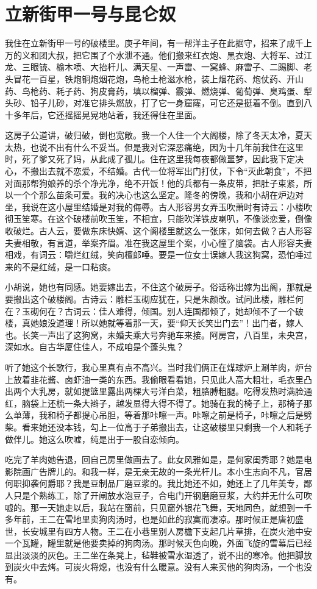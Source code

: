 \chapter{立新街甲一号与昆仑奴}

我住在立新街甲一号的破楼里。庚子年间，有一帮洋主子在此据守，招来了成千上万的义和团大叔，把它围了个水泄不通。他们搬来红衣炮、黑衣炮、大将军、过江龙、三眼铳、榆木喷、大抬杆儿、满天星、一声雷、一窝蜂、麻雷子、二踢脚、老头冒花一百星，铁炮铜炮烟花炮，鸟枪土枪滋水枪，装上烟花药、炮仗药、开山药、鸟枪药、耗子药、狗皮膏药，填以榴弹、霰弹、燃烧弹、葡萄弹、臭鸡蛋、犁头砂、铅子儿砂，对准它排头燃放，打了它一身窟窿，可它还是挺着不倒。直到八十多年后，它还摇摇晃晃地站着，我还得住在里面。 

这房子公道讲，破归破，倒也宽敞。我一个人住一个大阁楼，除了冬天太冷，夏天太热，也说不出有什么不妥当。但是我对它深恶痛绝，因为十几年前我住在这里时，死了爹又死了妈，从此成了孤儿。住在这里我每夜都做噩梦，因此我下定决心，不搬出去就不恋爱，不结婚。古代一位将军出门打仗，下令“灭此朝食”，不把对面那帮狗娘养的杀个净光净，绝不开饭！他的兵都有一条皮带，把肚子束紧，所以一个个那么苗条可爱。我的决心也这么坚定。隆冬的傍晚，我和小胡在炉边对坐，我说在这小屋里结婚是对我的侮辱。古人形容男女弄玉吹萧时有诗云：小楼吹彻玉笙寒。在这个破楼前吹玉笙，不相宜，只能吹洋铁皮喇叭，不像谈恋爱，倒像收破烂。古人云，要做东床快婿、这个阁楼里就这么一张床，如何去做？古人形容夫妻相敬，有言道，举案齐眉。准在我这屋里个案，小心憧了脑袋。古人形容夫妻相戏，有词云：嚼烂红绒，笑向檀郎唾。要是一位女士误嫁人我这狗窝，恐怕唾过来的不是红绒，是一口粘痰。 

小胡说，她也有同感。她要嫁出去，不住这个破房子。俗话称出嫁为出阁，那就是要搬出这个破楼阁。古诗云：雕栏玉砌应犹在，只是朱颜改。试问此楼，雕栏何在？玉砌何在？古词云：佳人难得，倾国。别人连国都倾了，她却倾不了一个破楼，真她娘没道理！所以她就等着那一天，要“仰天长笑出门去”！出门者，嫁人也。长笑一声出了这狗窝，未婚夫乘大号奔驰车来接。阿房宫，八百里，未央宫，深如水。自古华厦住佳人，不成咱是个蓬头鬼？ 

听了她这个长歌行，我心里真有点不高兴。当时我们俩正在煤球炉上涮羊肉，炉台上放着韭花酱、卤虾油一类的东西。我偷眼看看她，只见此人高大粗壮，毛衣里凸出两个大乳房，就如提篮里露出两棵大号洋白菜，粗胳膊粗腿。吃得发热时满脸通红，脑袋上还梳一条大辫子，越发显得大得不得了。她骑在我的椅子上，那椅子那么单薄，我和椅子都提心吊胆，等着那咔嚓一声。咔嚓之前是椅子，咔嚓之后是劈柴。看来她还没本钱，勾上一位高于子弟搬出去，让这破楼里只剩我一个人和耗子做伴儿。她这么吹嘘，纯是出于一股自恋倾向。 

吃完了羊肉她告退，回自己房里做画去了。此女风雅如是，是何家闺秀耶？她是电影院画广告牌儿的。和我一样，是无亲无故的一条光杆儿。本小生志向不凡，官居何职抑袭何爵耶？我是豆制品厂磨豆浆的。我比她还不如，她还上了几年美专，鄙人只是个熟练工，除了开闸放水泡豆子，合电门开钢磨磨豆浆，大约并无什么可吹嘘的。那一天她走以后，我站在窗前，只见窗外银花飞舞，天地同色，就想到一千多年前，王二在雪地里卖狗肉汤时，也是如此的寂寞而凄凉。那时候正是唐初盛世，长安城里有四方人物。王二在小巷里别人房檐下支起几片草排，在炭火池中安一个瓦罐，罐里就是他要卖掉的狗肉汤。那时候天色向晚，外面飞旋的雪幕后已经显出淡淡的灰色。王二坐在条凳上，毡鞋被雪水湿透了，说不出的寒冷。他把脚放到炭火中去烤。可炭火将熄，也没有什么暖意。没有人来买他的狗肉汤，一个也没有。 

